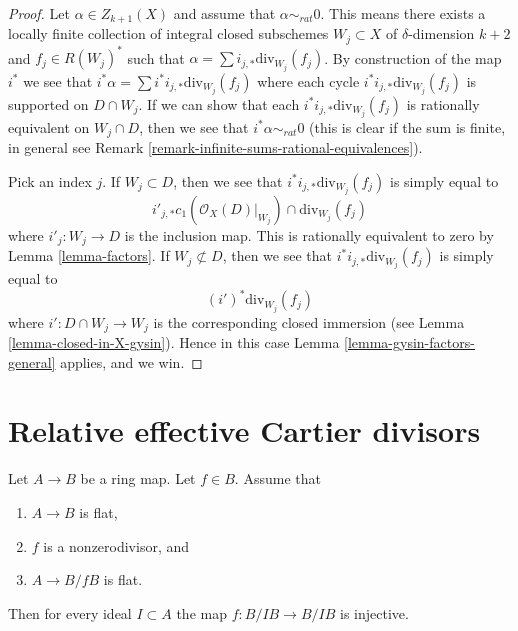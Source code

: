 \begin{proof}
Let $\alpha \in Z_{k + 1}(X)$ and assume that $\alpha \sim_{rat} 0$.
This means there exists a locally finite collection of integral
closed subschemes $W_j \subset X$ of $\delta$-dimension $k + 2$
and $f_j \in R(W_j)^*$ such that
$\alpha = \sum i_{j, *}\text{div}_{W_j}(f_j)$.
By construction of the map $i^*$ we see that
$i^*\alpha = \sum i^*i_{j, *}\text{div}_{W_j}(f_j)$
where each cycle $i^*i_{j, *}\text{div}_{W_j}(f_j)$
is supported on $D \cap W_j$. If we can show that each
$i^*i_{j, *}\text{div}_{W_j}(f_j)$ is rationally
equivalent on $W_j \cap D$, then we see that
$i^*\alpha \sim_{rat} 0$ (this is clear if the sum is finite,
in general see Remark \ref{remark-infinite-sums-rational-equivalences}).

\medskip\noindent
Pick an index $j$. If $W_j \subset D$, then we see that
$i^*i_{j, *}\text{div}_{W_j}(f_j)$ is simply equal
to
$$
i'_{j, *}c_1(\mathcal{O}_X(D)|_{W_j}) \cap \text{div}_{W_j}(f_j)
$$
where $i'_j : W_j \to D$ is the inclusion map.
This is rationally equivalent to zero by Lemma \ref{lemma-factors}.
If $W_j \not \subset D$, then we see that
$i^*i_{j, *}\text{div}_{W_j}(f_j)$ is simply equal
to
$$
(i')^*\text{div}_{W_j}(f_j)
$$
where $i' : D \cap W_j \to W_j$ is the corresponding closed immersion
(see Lemma \ref{lemma-closed-in-X-gysin}).
Hence in this case Lemma \ref{lemma-gysin-factors-general} applies,
and we win.
\end{proof}








\section{Relative effective Cartier divisors}
\label{section-relative-effective-cartier}

\begin{lemma}
\label{lemma-relative-effective-cartier-algebra}
Let $A \to B$ be a ring map. Let $f \in B$. Assume that
\begin{enumerate}
\item $A \to B$ is flat,
\item $f$ is a nonzerodivisor, and
\item $A \to B/fB$ is flat.
\end{enumerate}
Then for every ideal $I \subset A$ the map
$f : B/IB \to B/IB$ is injective.
\end{lemma}

